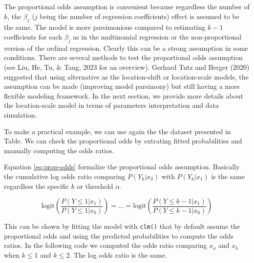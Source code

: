 \documentclass[
  man,floatsintext]{apa6}
\begin{document}
\normalsize

The proportional odds assumption is convenient because regardless the number of \(k\), the \(\beta_j\) (\(j\) being the number of regression coefficients) effect is assumed to be the same. The model is more parsimonious compared to estimating \(k - 1\) coefficients for each \(\beta_j\) as in the multinomial regression or the non-proportional version of the ordinal regression. Clearly this can be a strong assumption in some conditions. There are several methods to test the proportional odds assumption (see Liu, He, Tu, \& Tang, 2023 for an overview). Gerhard Tutz and Berger (2020) suggested that using alternative as the location-shift or location-scale models, the assumption can be made (improving model parsimony) but still having a more flexible modeling framework. In the next section, we provide more details about the location-scale model in terms of parameters interpretation and data simulation.

To make a practical example, we can use again the the dataset presented in Table. We can check the proportional odds by extrating fitted probabilities and manually computing the odds ratios.

Equation \eqref{eq:prop-odds} formalize the proportional odds assumption. Basically the cumulative log odds ratio comparing \(P(Y_k|x_0)\) with \(P(Y_k|x_1)\) is the same regardless the specific \(k\) or threshold \(\alpha\).

\begin{equation}
\text{logit} (\frac{P(Y \leq 1 |x_1)}{P(Y \leq 1 |x_0)}) = \dots = \text{logit} (\frac{P(Y \leq k - 1 |x_1)}{P(Y \leq k -1 |x_0)})
\label{eq:prop-odds}
\end{equation}

This can be shown by fitting the model with \texttt{clm()} that by default assume the proportional odds and using the predicted probabilities to compute the odds ratios. In the following code we computed the odds ratio comparing \(x_a\) and \(x_b\) when \(k \leq 1\) and \(k \leq 2\). The log odds ratio is the same.

\scriptsize
\end{document}
